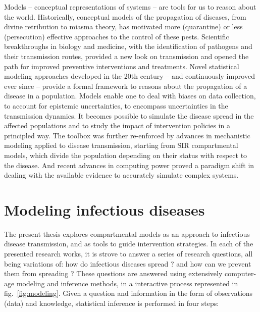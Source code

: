 Models -- conceptual representations of systems -- are tools for us to reason about the world. Historically, conceptual models of the propagation of diseases, from divine retribution to miasma theory, has motivated more (quarantine) or less (persecution) effective approaches to the control of these pests. Scientific breakthroughs in biology and medicine, with the identification of pathogens and their transmission routes, provided a new look on transmission and opened the path for improved preventive interventions and treatments. Novel statistical modeling approaches\cite[-3\baselineskip]{Freedman:AssociationCausationRemarks:1999} developed in the 20th century -- and continuously improved ever since\cite{Gelman:WhatAreMost:2021} --  provide a formal framework to reasons about the propagation of a disease in a population. Models enable one to deal with biases on data collection, to account for epistemic uncertainties, to encompass uncertainties in the transmission dynamics. It becomes possible to simulate the disease spread in the affected populations and to study the impact of intervention policies in a principled way. The toolbox was further re-enforced by advances in mechanistic modeling applied to disease transmission, starting from SIR compartmental models\cite{Kermack:ContributionMathematicalTheory:1927, Anderson:PopulationBiologyInfectious:1979}, which divide the population depending on their status with respect to the disease. And recent advances in computing power proved a paradigm shift in dealing with the available evidence to accurately simulate complex systems.



\section{Modeling infectious diseases}
The present thesis explores compartmental models as an approach to infectious disease transmission, and as tools to guide intervention strategies. In each of the presented research works, it is strove to answer a series of research questions, all being variations of: how do infectious diseases spread ? and how can we prevent them from spreading ? These questions are answered using extensively computer-age modeling and inference methods, in a interactive process represented in fig.~\ref{fig:modeling}. Given a question and information in the form of observations (data) and knowledge, statistical inference is performed in four steps:

